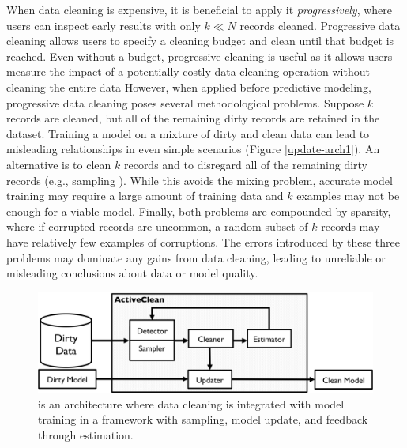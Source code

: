 When data cleaning is expensive, it is beneficial to apply it \emph{progressively}, where users can inspect early results with only $k \ll N$ records cleaned.
Progressive data cleaning allows users to specify a cleaning budget and clean until that budget is reached.
Even without a budget, progressive cleaning is useful as it allows users measure the impact of a potentially costly data cleaning operation without cleaning the entire data
However, when applied before predictive modeling, progressive data cleaning poses several methodological problems.
Suppose $k$ records are cleaned, but all of the remaining dirty records are retained in the dataset.
Training a model on a mixture of dirty and clean data can lead to misleading relationships in even simple scenarios (Figure \ref{update-arch1}).
An alternative is to clean $k$ records and to disregard all of the remaining dirty records (e.g., sampling \cite{wang1999sample}).
While this avoids the mixing problem, accurate model training may require a large amount of training data and $k$ examples may not be enough for a viable model.
Finally, both problems are compounded by sparsity, where if corrupted records are uncommon, a random subset of $k$ records may have relatively few examples of corruptions.
The errors introduced by these three problems may dominate any gains from data cleaning, leading to unreliable or misleading conclusions about data or model quality.

\begin{figure}[t]
\centering
 \includegraphics[width=\columnwidth]{figs/arch.png}
 \caption{\sysfull is an architecture where data cleaning is integrated with model training in a framework with sampling, model update, and feedback through estimation. \label{sys-arch}}\vspace{-2em}
\end{figure}

